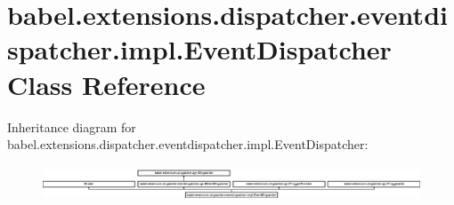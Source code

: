 \hypertarget{classbabel_1_1extensions_1_1dispatcher_1_1eventdispatcher_1_1impl_1_1_event_dispatcher}{\section{babel.\-extensions.\-dispatcher.\-eventdispatcher.\-impl.\-Event\-Dispatcher Class Reference}
\label{classbabel_1_1extensions_1_1dispatcher_1_1eventdispatcher_1_1impl_1_1_event_dispatcher}
}
Inheritance diagram for babel.\-extensions.\-dispatcher.\-eventdispatcher.\-impl.\-Event\-Dispatcher\-:\begin{figure}[H]
\begin{center}
\leavevmode
\includegraphics[height=1.065990cm]{classbabel_1_1extensions_1_1dispatcher_1_1eventdispatcher_1_1impl_1_1_event_dispatcher}
\end{center}
\end{figure}
